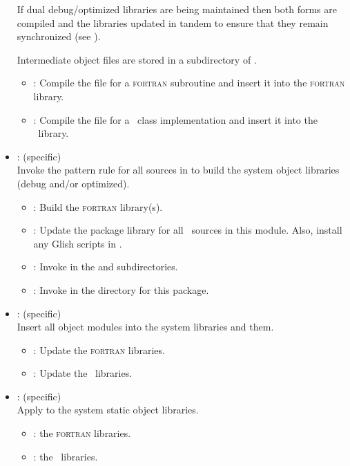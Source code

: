\begin{itemize}
   If dual debug/optimized libraries are being maintained then both forms are
   compiled and the libraries updated in tandem to ensure that they remain
   synchronized (see ).

   Intermediate object files are stored in a subdirectory of
   .

   \begin{itemize}
   \item
      : Compile the  file for a \textsc{fortran} subroutine
      and insert it into the \textsc{fortran} library.
   \item
      : Compile the  file for a \cplusplus\ class
      implementation and insert it into the \cplusplus\ library.
   \end{itemize}

\item
    : (specific)
   \\ Invoke the  pattern rule for all sources in
    to build the system object libraries (debug and/or
   optimized).
   \begin{itemize}
   \item
      : Build the \textsc{fortran} library(s).
   \item
      : Update the package library for all \cplusplus\ sources in
      this module.  Also, install any Glish scripts in .
   \item
      : Invoke  in the  and
       subdirectories.
   \item
      : Invoke  in the  directory for
      this package.
   \end{itemize}

\item
    : (specific)
   \\ Insert all object modules into the system libraries and 
   them.
   \begin{itemize}
   \item
      : Update the \textsc{fortran} libraries.
   \item
      : Update the \cplusplus\ libraries.
   \end{itemize}

\item
    : (specific)
   \\ Apply  to the system static object libraries.
   \begin{itemize}
   \item
      :  the \textsc{fortran} libraries.
   \item
      :  the \cplusplus\ libraries.
   \end{itemize}


\end{itemize}
